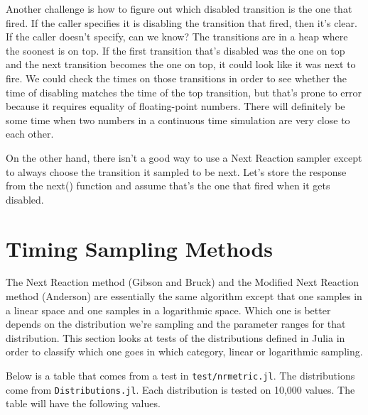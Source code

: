 \documentclass{article}
\begin{document}
Another challenge is how to figure out which disabled transition is the one that fired. If the caller specifies it is disabling the transition that fired, then it's clear. If the caller doesn't specify, can we know? The transitions are in a heap where the soonest is on top. If the first transition that's disabled was the one on top and the next transition becomes the one on top, it could look like it was next to fire. We could check the times on those transitions in order to see whether the time of disabling matches the time of the top transition, but that's prone to error because it requires equality of floating-point numbers. There will definitely be some time when two numbers in a continuous time simulation are very close to each other.

On the other hand, there isn't a good way to use a Next Reaction sampler except to always choose the transition it sampled to be next. Let's store the response from the next() function and assume that's the one that fired when it gets disabled.

\section{Timing Sampling Methods}

The Next Reaction method (Gibson and Bruck) and the Modified Next Reaction method (Anderson) are essentially the same algorithm except that one samples in a linear space and one samples in a logarithmic space. Which one is better depends on the distribution we're sampling and the parameter ranges for that distribution. This section looks at tests of the distributions defined in Julia in order to classify which one goes in which category, linear or logarithmic sampling.

Below is a table that comes from a test in \texttt{test/nrmetric.jl}. The distributions come from \texttt{Distributions.jl}. Each distribution is tested on 10,000 values. The table will have the following values.
\end{document}
